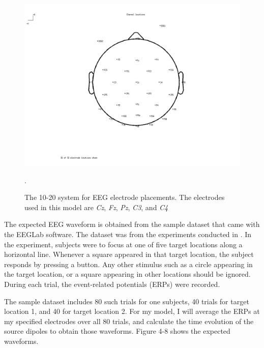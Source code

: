 \documentclass{article}
\begin{document}
\begin{figure}
    \begin{center}
        \includegraphics[scale=0.5]{channel_locations.png}
        \caption{The 10-20 system for EEG electrode placements. The electrodes used in this model are \emph{Cz}, \emph{Fz}, \emph{Pz}, \emph{C3}, and \emph{C4}}.
    \end{center}
\end{figure}

The expected EEG waveform is obtained from the sample dataset that came with the EEGLab software\cite{EEGLab}. The dataset was from the experiments conducted in \cite{EEGSource}. In the experiment, subjects were to focus at one of five target locations along a horizontal line. Whenever a square appeared in that target location, the subject responds by pressing a button. Any other stimulus such as a circle appearing in the target location, or a square appearing in other locations should be ignored. During each trial, the event-related potentials (ERPs) were recorded.

The sample dataset includes 80 such trials for one subjects, 40 trials for target location 1, and 40 for target location 2. For my model, I will average the ERPs at my specified electrodes over all 80 trials, and calculate the time evolution of the source dipoles to obtain those waveforms. Figure 4-8 shows the expected waveforms.
\end{document}
